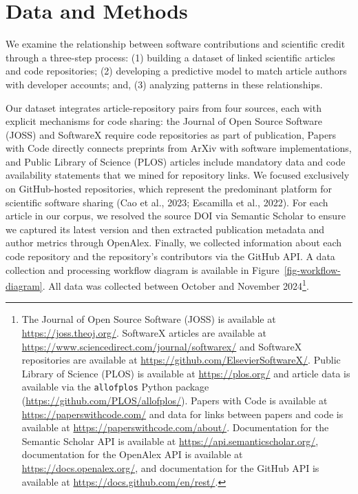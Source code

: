 \documentclass[
  number,
  3p,
  onecolumn]{elsarticle}
\begin{document}
\section{Data and Methods}\label{data-and-methods}

We examine the relationship between software contributions and
scientific credit through a three-step process: (1) building a dataset
of linked scientific articles and code repositories; (2) developing a
predictive model to match article authors with developer accounts; and,
(3) analyzing patterns in these relationships.

Our dataset integrates article-repository pairs from four sources, each
with explicit mechanisms for code sharing: the Journal of Open Source
Software (JOSS) and SoftwareX require code repositories as part of
publication, Papers with Code directly connects preprints from ArXiv
with software implementations, and Public Library of Science (PLOS)
articles include mandatory data and code availability statements that we
mined for repository links. We focused exclusively on GitHub-hosted
repositories, which represent the predominant platform for scientific
software sharing (Cao et al., 2023; Escamilla et al., 2022). For each
article in our corpus, we resolved the source DOI via Semantic Scholar
to ensure we captured its latest version and then extracted publication
metadata and author metrics through OpenAlex. Finally, we collected
information about each code repository and the repository's contributors
via the GitHub API. A data collection and processing workflow diagram is
available in Figure~\ref{fig-workflow-diagram}. All data was collected
between October and November 2024\footnote{The Journal of Open Source
  Software (JOSS) is available at \url{https://joss.theoj.org/}.
  SoftwareX articles are available at
  \url{https://www.sciencedirect.com/journal/softwarex/} and SoftwareX
  repositories are available at
  \url{https://github.com/ElsevierSoftwareX/}. Public Library of Science
  (PLOS) is available at \url{https://plos.org/} and article data is
  available via the \texttt{allofplos} Python package
  (\url{https://github.com/PLOS/allofplos/}). Papers with Code is
  available at \url{https://paperswithcode.com/} and data for links
  between papers and code is available at
  \url{https://paperswithcode.com/about/}. Documentation for the
  Semantic Scholar API is available at
  \url{https://api.semanticscholar.org/}, documentation for the OpenAlex
  API is available at \url{https://docs.openalex.org/}, and
  documentation for the GitHub API is available at
  \url{https://docs.github.com/en/rest/}.}.
\end{document}
